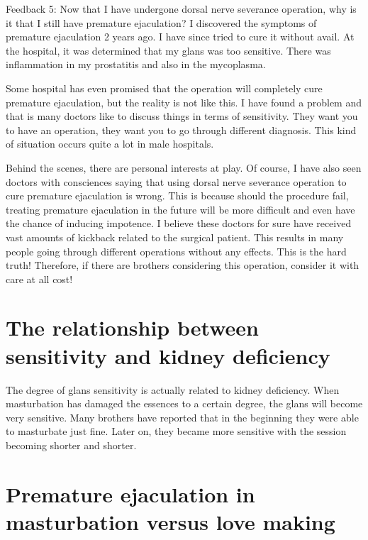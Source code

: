 \documentclass[
]{book}
\begin{document}
Feedback 5: Now that I have undergone dorsal nerve severance operation, why is it that I still have premature ejaculation? I discovered the symptoms of premature ejaculation 2 years ago. I have since tried to cure it without avail. At the hospital, it was determined that my glans was too sensitive. There was inflammation in my prostatitis and also in the mycoplasma.

Some hospital has even promised that the operation will completely cure premature ejaculation, but the reality is not like this. I have found a problem and that is many doctors like to discuss things in terms of sensitivity. They want you to have an operation, they want you to go through different diagnosis. This kind of situation occurs quite a lot in male hospitals.

Behind the scenes, there are personal interests at play. Of course, I have also seen doctors with consciences saying that using dorsal nerve severance operation to cure premature ejaculation is wrong. This is because should the procedure fail, treating premature ejaculation in the future will be more difficult and even have the chance of inducing impotence. I believe these doctors for sure have received vast amounts of kickback related to the surgical patient. This results in many people going through different operations without any effects. This is the hard truth! Therefore, if there are brothers considering this operation, consider it with care at all cost!

\hypertarget{the-relationship-between-sensitivity-and-kidney-deficiency}{%
\section{The relationship between sensitivity and kidney deficiency}\label{the-relationship-between-sensitivity-and-kidney-deficiency}}

The degree of glans sensitivity is actually related to kidney deficiency. When masturbation has damaged the essences to a certain degree, the glans will become very sensitive. Many brothers have reported that in the beginning they were able to masturbate just fine. Later on, they became more sensitive with the session becoming shorter and shorter.

\hypertarget{premature-ejaculation-in-masturbation-versus-love-making}{%
\section{Premature ejaculation in masturbation versus love making}\label{premature-ejaculation-in-masturbation-versus-love-making}}
\end{document}

